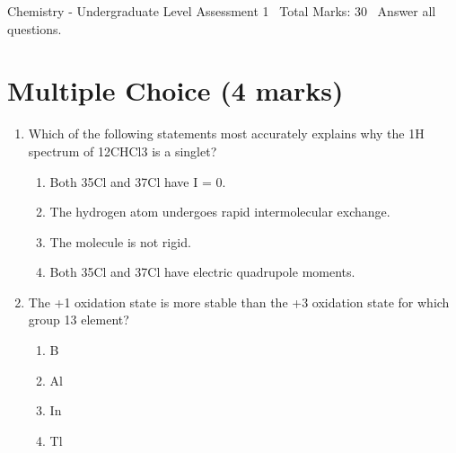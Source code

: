 \documentclass[12pt]{article}
\begin{document}
\begin{center}
Chemistry - Undergraduate Level Assessment 1 \
Total Marks: 30 \
Answer all questions.
\end{center}

\section*{Multiple Choice (4 marks)}
\begin{enumerate}[label=\arabic*.]
\item Which of the following statements most accurately explains why the 1H spectrum of 12CHCl3 is a singlet?
\begin{enumerate}[label=(\alph*)]
    \item Both 35Cl and 37Cl have I = 0.
    \item The hydrogen atom undergoes rapid intermolecular exchange.
    \item The molecule is not rigid.
    \item Both 35Cl and 37Cl have electric quadrupole moments.
\end{enumerate}
\item The +1 oxidation state is more stable than the +3 oxidation state for which group 13 element?
\begin{enumerate}[label=(\alph*)]
    \item B
    \item Al
    \item In
    \item Tl
\end{enumerate}
\end{enumerate}
\end{document}
